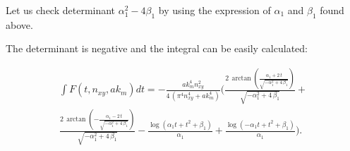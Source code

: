 \documentclass[twoside, 10pt]{article}
\begin{document}
\begin{multicols}{2}
    Let us check determinant \(\alpha_1^2 - 4\beta_1\) by using the
expression of \(\alpha_1\) and \(\beta_1\) found above.

    The determinant is negative and the integral can be easily calculated:

\noindent
    \[\begin{array}{r} \int F\left(t, n_{xy}, ak_m\right) dt = -\frac{\mathit{ak}_{m}^{4} n_{\mathit{xy}}^{2}}{4 \, {\left(\pi^{4} n_{\mathit{xy}}^{4} + \mathit{ak}_{m}^{4}\right)}} \Bigg(\frac{2 \, \arctan\left(\frac{\alpha_{1} + 2 \, t}{\sqrt{-\alpha_{1}^{2} + 4 \, \beta_{1}}}\right)}{\sqrt{-\alpha_{1}^{2} + 4 \, \beta_{1}}} + \\ \frac{2 \, \arctan\left(-\frac{\alpha_{1} - 2 \, t}{\sqrt{-\alpha_{1}^{2} + 4 \, \beta_{1}}}\right)}{\sqrt{-\alpha_{1}^{2} + 4 \, \beta_{1}}} - \frac{\log\left(\alpha_{1} t + t^{2} + \beta_{1}\right)}{\alpha_{1}} + \frac{\log\left(-\alpha_{1} t + t^{2} + \beta_{1}\right)}{\alpha_{1}}\Bigg). \end{array}\]






\end{multicols}
\end{document}
